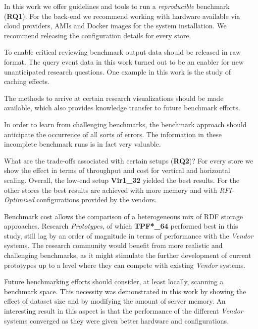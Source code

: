 
In this work we offer guidelines and tools to run a \emph{reproducible} benchmark (\textbf{RQ1}). For the back-end we recommend working with hardware available via cloud providers, AMIs and Docker images for the system installation. We recommend releasing the configuration details for every store. 

To enable critical reviewing benchmark output data should be released in raw format. The  query event data in this work turned out to be an enabler for new unanticipated research questions. One example in this work is the study of caching effects. 

The methods to arrive at certain research visualizations should be made available, which also provides knowledge transfer to future benchmark efforts. 

In order to learn from challenging benchmarks, the benchmark approach should anticipate the occurrence of all sorts of errors. The information in these incomplete benchmark runs is in fact very valuable. 

What are the trade-offs associated with certain setups (\textbf{RQ2})? For every store we show the effect in terms of throughput and cost for vertical and horizontal scaling. 
Overall, the low-end setup \textbf{Vir1\_32} yielded the best results. For the other stores the best results are achieved with more memory and with \emph{RFI-Optimized} configurations provided by the vendors.

Benchmark cost allows the comparison of a heterogeneous mix of RDF storage approaches. Research \emph{Prototypes}, of which \textbf{TPF*\_64} performed best in this study, still lag by an order of magnitude in terms of performance with the \emph{Vendor} systems. The research community would benefit from more realistic and challenging benchmarks, as it might stimulate the further development of current prototypes up to a level where they can compete with existing \emph{Vendor} systems.

Future benchmarking efforts should consider, at least locally, scanning a benchmark space. This necessity was demonstrated in this work by showing the effect of dataset size and by modifying the amount of server memory. An interesting result in this aspect is that the performance of the different \emph{Vendor} systems converged as they were given better hardware and configurations.

